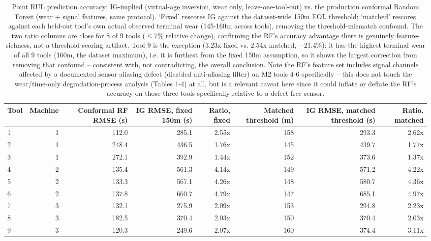 \begin{table}[t]
\centering
\caption{Point RUL prediction accuracy: IG-implied (virtual-age inversion, wear only, leave-one-tool-out) vs. the production conformal Random Forest (wear + signal features, same protocol). `Fixed' rescores IG against the dataset-wide 150\textmu m EOL threshold; `matched' rescores against each held-out tool's own actual observed terminal wear (145-160\textmu m across tools), removing the threshold-mismatch confound. The two ratio columns are close for 8 of 9 tools ($\leq$7\% relative change), confirming the RF's accuracy advantage there is genuinely feature-richness, not a threshold-scoring artifact. Tool 9 is the exception (3.23x fixed vs. 2.54x matched, $-$21.4\%): it has the highest terminal wear of all 9 tools (160\textmu m, the dataset maximum), i.e. it is furthest from the fixed 150\textmu m assumption, so it shows the largest correction from removing that confound -- consistent with, not contradicting, the overall conclusion. Note the RF's feature set includes signal channels affected by a documented sensor aliasing defect (disabled anti-aliasing filter) on M2 tools 4-6 specifically -- this does not touch the wear/time-only degradation-process analysis (Tables 1-4) at all, but is a relevant caveat here since it could inflate or deflate the RF's accuracy on those three tools specifically relative to a defect-free sensor.}
\label{tab:rul-comparison}
\begin{tabular}{lrrrrrrr}
\toprule
Tool & Machine & Conformal RF RMSE (s) & IG RMSE, fixed 150\textmu{}m (s) & Ratio, fixed & Matched threshold (\textmu{}m) & IG RMSE, matched threshold (s) & Ratio, matched \\
\midrule
1 & 1 & 112.0 & 285.1 & 2.55x & 158 & 293.3 & 2.62x \\
2 & 1 & 248.4 & 436.5 & 1.76x & 145 & 439.7 & 1.77x \\
3 & 1 & 272.1 & 392.9 & 1.44x & 152 & 373.6 & 1.37x \\
4 & 2 & 135.4 & 561.3 & 4.14x & 149 & 571.2 & 4.22x \\
5 & 2 & 133.3 & 567.1 & 4.26x & 148 & 580.7 & 4.36x \\
6 & 2 & 137.8 & 660.7 & 4.79x & 147 & 685.1 & 4.97x \\
7 & 3 & 132.1 & 275.9 & 2.09x & 153 & 294.8 & 2.23x \\
8 & 3 & 182.5 & 370.4 & 2.03x & 150 & 370.4 & 2.03x \\
9 & 3 & 120.3 & 249.6 & 2.07x & 160 & 374.4 & 3.11x \\
\bottomrule
\end{tabular}
\end{table}
